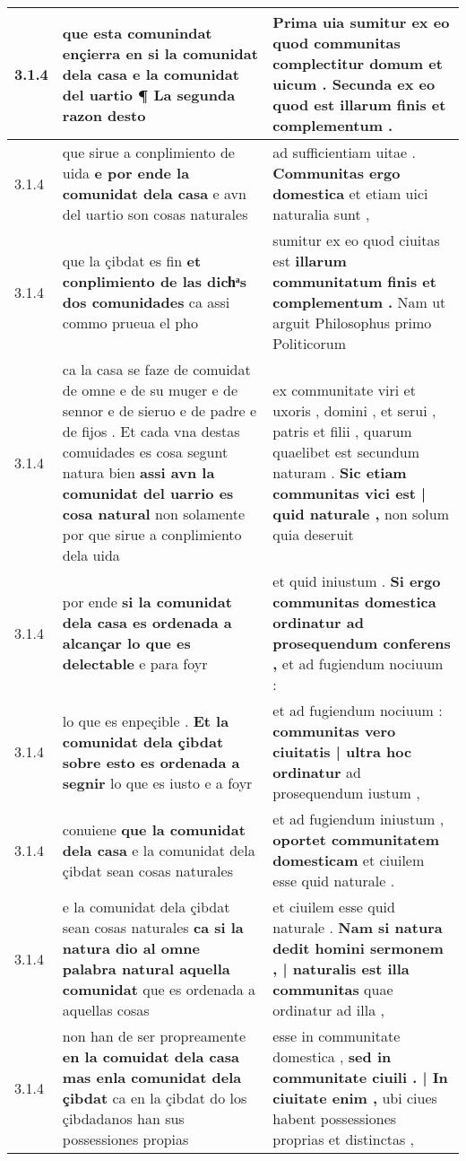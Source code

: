 \begin{tabular}{|p{1cm}|p{6.5cm}|p{6.5cm}|}
3.1.4 & que esta comunindat ençierra en si la comunidat dela casa \textbf{ e la comunidat del uartio ¶ } La segunda razon desto & Prima uia sumitur \textbf{ ex eo quod communitas complectitur domum et uicum . } Secunda ex eo quod est illarum finis et complementum . \\\hline
3.1.4 & que sirue a conplimiento de uida \textbf{ e por ende la comunidat dela casa } e avn del uartio son cosas naturales & ad sufficientiam uitae . \textbf{ Communitas ergo domestica } et etiam uici naturalia sunt , \\\hline
3.1.4 & que la çibdat es fin \textbf{ et conplimiento de las dichͣs dos comunidades } ca assi commo prueua el pho & sumitur ex eo quod ciuitas est \textbf{ illarum communitatum finis et complementum . } Nam ut arguit Philosophus primo Politicorum \\\hline
3.1.4 & ca la casa se faze de comuidat de omne e de su muger e de sennor e de sieruo e de padre e de fijos . Et cada vna destas comuidades es cosa segunt natura bien \textbf{ assi avn la comunidat del uarrio es cosa natural } non solamente por que sirue a conplimiento dela uida & ex communitate viri et uxoris , domini , et serui , patris et filii , quarum quaelibet est secundum naturam . \textbf{ Sic etiam communitas vici est | quid naturale , } non solum quia deseruit \\\hline
3.1.4 & por ende \textbf{ si la comunidat dela casa es ordenada a alcançar lo que es delectable } e para foyr & et quid iniustum . \textbf{ Si ergo communitas domestica ordinatur ad prosequendum conferens , } et ad fugiendum nociuum : \\\hline
3.1.4 & lo que es enpeçible . \textbf{ Et la comunidat dela çibdat sobre esto es ordenada a segnir } lo que es iusto e a foyr & et ad fugiendum nociuum : \textbf{ communitas vero ciuitatis | ultra hoc ordinatur } ad prosequendum iustum , \\\hline
3.1.4 & conuiene \textbf{ que la comunidat dela casa } e la comunidat dela çibdat sean cosas naturales & et ad fugiendum iniustum , \textbf{ oportet communitatem domesticam } et ciuilem esse quid naturale . \\\hline
3.1.4 & e la comunidat dela çibdat sean cosas naturales \textbf{ ca si la natura dio al omne palabra natural aquella comunidat } que es ordenada a aquellas cosas & et ciuilem esse quid naturale . \textbf{ Nam si natura dedit homini sermonem , | naturalis est illa communitas } quae ordinatur ad illa , \\\hline
3.1.4 & non han de ser propreamente \textbf{ en la comuidat dela casa mas enla comunidat dela çibdat } ca en la çibdat do los çibdadanos han sus possessiones propias & esse in communitate domestica , \textbf{ sed in communitate ciuili . | In ciuitate enim , } ubi ciues habent possessiones proprias et distinctas , \\\hline

\end{tabular}
